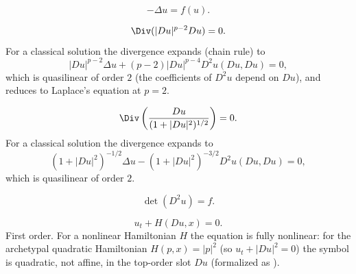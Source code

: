 \begin{example}
\label{ex:nonlinear-poisson-equation}
\leanok
$$-\Delta u = f(u).$$
\end{example}

\begin{example}
\label{ex:p-laplacian-equation}
\leanok
$$\Div(|Du|^{p-2}Du) = 0.$$
For a classical solution the divergence expands (chain rule) to
$$|Du|^{p-2}\Delta u + (p-2)|Du|^{p-4} D^2u(Du,Du) = 0,$$
which is quasilinear of order $2$ (the coefficients of $D^2u$ depend on $Du$), and reduces to Laplace's equation at $p = 2$.
\end{example}

\begin{example}
\label{ex:minimal-surface-equation}
\leanok
$$\Div\left(\frac{Du}{(1+|Du|^2)^{1/2}}\right) = 0.$$
For a classical solution the divergence expands to
$$(1+|Du|^2)^{-1/2}\Delta u - (1+|Du|^2)^{-3/2} D^2u(Du,Du) = 0,$$
which is quasilinear of order $2$.
\end{example}

\begin{example}
\label{ex:monge-ampere-equation}
\leanok
$$\det(D^2u) = f.$$
\end{example}

\begin{example}
\label{ex:hamilton-jacobi-equation}
\leanok
$$u_t + H(Du, x) = 0.$$
First order. For a nonlinear Hamiltonian $H$ the equation is fully nonlinear: for the archetypal quadratic Hamiltonian $H(p,x) = |p|^2$ (so $u_t + |Du|^2 = 0$) the symbol is quadratic, not affine, in the top-order slot $Du$ (formalized as ).
\end{example}

